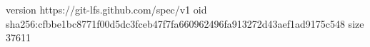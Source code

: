 version https://git-lfs.github.com/spec/v1
oid sha256:cfbbe1bc8771f00d5dc3fceb47f7fa660962496fa913272d43aef1ad9175c548
size 37611
